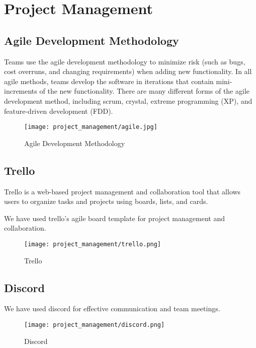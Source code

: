 \chapter{Project Management}
\section{Agile Development Methodology}
Teams use the agile development methodology to minimize risk (such as bugs, cost overruns, and changing requirements) when adding new functionality. In all agile methods, teams develop the software in iterations that contain mini-increments of the new functionality. There are many different forms of the agile development method, including scrum, crystal, extreme programming (XP), and feature-driven development (FDD).

\begin{figure}[H]
    \centering
    \texttt{[image: project\_management/agile.jpg]}
    \caption{Agile Development Methodology}
    \label{fig:Agile Development Methodology}
\end{figure}

\section{Trello}
Trello is a web-based project management and collaboration tool that allows users to organize tasks and projects using boards, lists, and cards. 

We have used trello's agile board template for project management and collaboration.
\begin{figure}[H]
    \centering
    \texttt{[image: project\_management/trello.png]}
    \caption{Trello}
    \label{fig:Trello}
\end{figure}

\section{Discord}
We have used discord for effective communication and team meetings.

\begin{figure}[H]
    \centering
    \texttt{[image: project\_management/discord.png]}
    \caption{Discord}
    \label{fig:Discord}
\end{figure}



